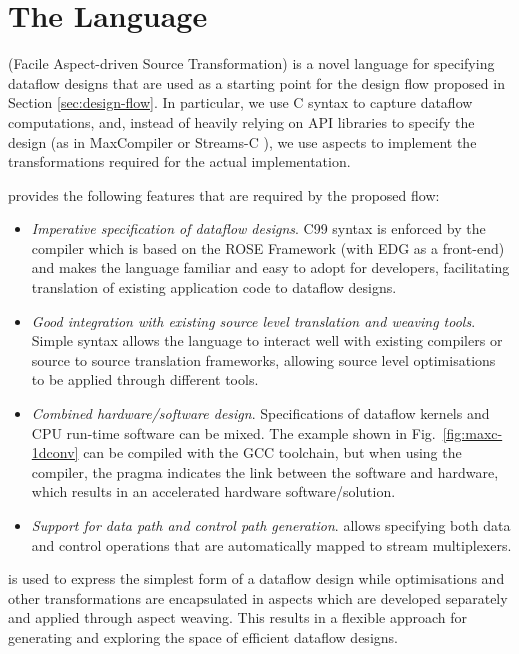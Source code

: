 \section{The \MAXC{} Language}
\label{sec:maxc}

\MAXC{} (Facile Aspect-driven Source Transformation) is a novel
language for specifying dataflow designs that are used as a starting
point for the design flow proposed in Section
\ref{sec:design-flow}. In particular, we use C syntax to capture
dataflow computations, and, instead of heavily relying on API libraries
to specify the design (as in MaxCompiler \cite{5719584} or Streams-C
\cite{Gokhale:Stone:Arnold:Kalinowski:2000}), we use aspects to
implement the transformations required for the actual implementation.

\MAXC{} provides the following features that are
required by the proposed flow:

\begin{itemize}
\item \emph{Imperative specification of dataflow designs}. C99 syntax is
  enforced by the \MAXC{} compiler which is based on the ROSE
  Framework (with EDG as a front-end) and makes the language familiar
  and easy to adopt for developers, facilitating translation of
  existing application code to dataflow designs.
\item \emph{Good integration with existing source level translation and
  weaving tools}. Simple syntax allows the language to interact well
  with existing compilers or source to source translation frameworks,
  allowing source level optimisations to be applied through different
  tools.
\item \emph{Combined hardware/software design}. Specifications of dataflow
  kernels and CPU run-time software can be mixed. The example shown in
  Fig.~\ref{fig:maxc-1dconv} can be compiled with the GCC toolchain,
  but when using the \MAXC{} compiler, the pragma indicates the link
  between the software and hardware, which results in an accelerated
  hardware software/solution.
\item \emph{Support for data path and control path generation}. \MAXC{}
  allows specifying both data and control operations that are
  automatically mapped to stream multiplexers.
\end{itemize}

\MAXC{} is used to express the simplest form of a dataflow design
while optimisations and other transformations are encapsulated in
aspects which are developed separately and applied through aspect
weaving. This results in a flexible approach for generating and
exploring the space of efficient dataflow designs.

